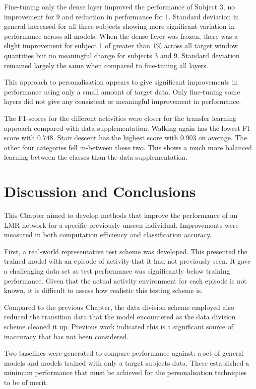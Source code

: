 Fine-tuning only the dense layer improved the performance of Subject 3, no improvement for 9 and reduction in performance for 1. Standard deviation in general increased for all three subjects showing more significant variation in performance across all models. When the dense layer was frozen, there was a slight improvement for subject 1 of greater than $1\%$ across all target window quantities but no meaningful change for subjects 3 and 9. Standard deviation remained largely the same when compared to fine-tuning all layers.

This approach to personalisation appears to give significant improvements in performance using only a small amount of target data. Only fine-tuning some layers did not give any consistent or meaningful improvement in performance.

The F1-scores for the different activities were closer for the transfer learning approach compared with data supplementation. Walking again has the lowest F1 score with $0.748$. Stair descent has the highest score with $0.903$ on average. The other four categories fell in-between these two. This shows a much more balanced learning between the classes than the data supplementation.

\section{Discussion and Conclusions}
\label{sec:personalisation-discussion}
This Chapter aimed to develop methods that improve the performance of an LMR network for a specific previously unseen individual. Improvements were measured in both computation efficiency and classification accuracy.

First, a real-world representative test scheme was developed. This presented the trained model with an episode of activity that it had not previously seen. It gave a challenging data set as test performance was significantly below training performance. Given that the actual activity environment for each episode is not known, it is difficult to assess how realistic this testing scheme is.

Compared to the previous Chapter, the data division scheme employed also reduced the transition data that the model encountered as the data division scheme cleaned it up. Previous work indicated this is a significant source of inaccuracy that has not been considered.

Two baselines were generated to compare performance against: a set of general models and models trained with only a target subjects data. These established a minimum performance that must be achieved for the personalisation techniques to be of merit.

